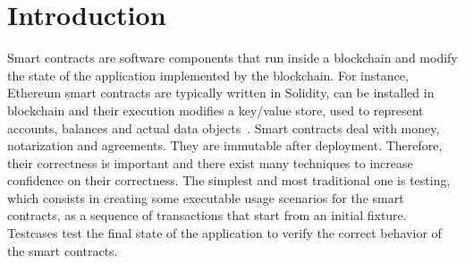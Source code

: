 \section{Introduction}\label{sec:introduction}

Smart contracts are software components that
run inside a blockchain and modify the state
of the application implemented by the blockchain.
For instance, Ethereum smart contracts are typically written in
Solidity, can be installed in blockchain and their
execution modifies a key/value store, used to represent accounts, balances
and actual data objects~\citep{AntonopoulosWPMP25}. Smart contracts
deal with money, notarization and agreements. They are immutable after
deployment. Therefore, their correctness is important and there exist
many techniques to increase confidence on their correctness.
The simplest and most traditional one is testing, which consists
in creating some executable usage scenarios for the smart contracts,
as a sequence of transactions that start from an initial fixture.
Testcases test the final state of the application to verify the correct
behavior of the smart contracts.

